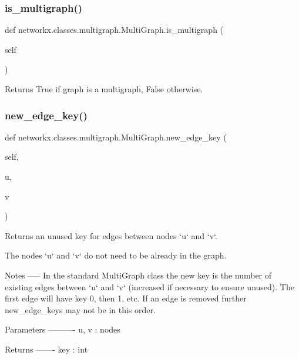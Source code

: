 \subsubsection{\texorpdfstring{is\+\_\+multigraph()}{is\_multigraph()}}
{\footnotesize\ttfamily def networkx.\+classes.\+multigraph.\+Multi\+Graph.\+is\+\_\+multigraph (\begin{DoxyParamCaption}\item[{}]{self }\end{DoxyParamCaption})}

\begin{DoxyVerb}Returns True if graph is a multigraph, False otherwise.\end{DoxyVerb}
 \mbox{\label{classnetworkx_1_1classes_1_1multigraph_1_1MultiGraph_ae125eb2d60100c0b4b270031c0e7db18}} 
\subsubsection{\texorpdfstring{new\+\_\+edge\+\_\+key()}{new\_edge\_key()}}
{\footnotesize\ttfamily def networkx.\+classes.\+multigraph.\+Multi\+Graph.\+new\+\_\+edge\+\_\+key (\begin{DoxyParamCaption}\item[{}]{self,  }\item[{}]{u,  }\item[{}]{v }\end{DoxyParamCaption})}

\begin{DoxyVerb}Returns an unused key for edges between nodes `u` and `v`.

The nodes `u` and `v` do not need to be already in the graph.

Notes
-----
In the standard MultiGraph class the new key is the number of existing
edges between `u` and `v` (increased if necessary to ensure unused).
The first edge will have key 0, then 1, etc. If an edge is removed
further new_edge_keys may not be in this order.

Parameters
----------
u, v : nodes

Returns
-------
key : int
\end{DoxyVerb}
 \mbox{\label{classnetworkx_1_1classes_1_1multigraph_1_1MultiGraph_a3106d334d033a0421b40712b28775e0b}} 

